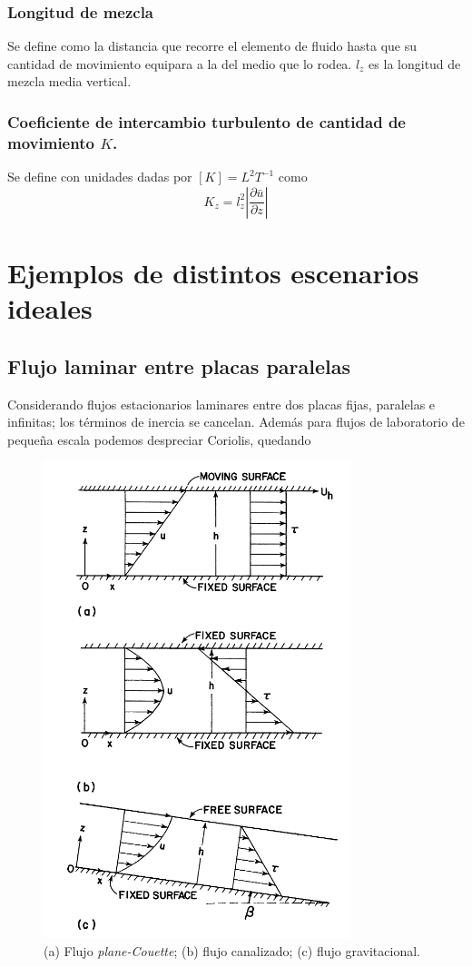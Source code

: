 \documentclass[openany,a4]{book}
\begin{document}
\subsubsection{Longitud de mezcla}
Se define como la distancia que recorre el elemento de fluido hasta que
su cantidad de movimiento equipara a la del medio que lo rodea. $l_z$
es la longitud de mezcla media vertical.

\subsubsection{Coeficiente de intercambio turbulento de cantidad de movimiento $K$.}
\par Se define con unidades dadas por $[K]=L^{2}T^{-1}$ como 
\begin{equation}
    K_{z}=l_{z}^{2}\left|\frac{\partial \bar{u}}{\partial z}\right|
\end{equation}

\section{Ejemplos de distintos escenarios ideales}

\subsection{Flujo laminar entre placas paralelas}
Considerando flujos estacionarios laminares entre dos placas
fijas, paralelas e infinitas; los términos de inercia se cancelan. Además 
para flujos de laboratorio de pequeña escala podemos despreciar
Coriolis, quedando

\begin{figure}[htb]
    \centering
    \includegraphics[width=0.6\linewidth]{img/laminar-fluxes.png}
    \caption{(a) Flujo \emph{plane-Couette}; (b) flujo canalizado;
    (c) flujo gravitacional.}
    \label{fig:laminar-flows}
\end{figure}
\end{document}
